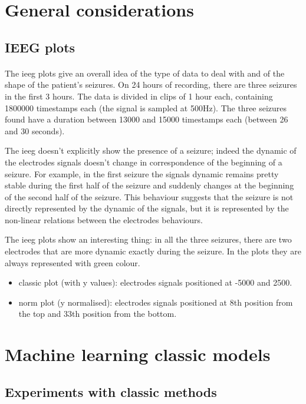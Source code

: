 \section{General considerations}

\subsection{IEEG plots}
\paragraph{} The ieeg plots give an overall idea of the type of data to deal with and of the shape of the patient's seizures. On 24 hours of recording, there are three seizures in the first 3 hours. The data is divided in clips of 1 hour each, containing 1800000 timestamps each (the signal is sampled at 500Hz). The three seizures found have a duration between 13000 and 15000 timestamps each (between 26 and 30 seconds).

The ieeg doesn't explicitly show the presence of a seizure; indeed the dynamic of the electrodes signals doesn't change in correspondence of the beginning of a seizure. For example, in the first seizure the signals dynamic remains pretty stable during the first half of the seizure and suddenly changes at the beginning of the second half of the seizure. This behaviour suggests that the seizure is not directly represented by the dynamic of the signals, but it is represented by the non-linear relations between the electrodes behaviours.

The ieeg plots show an interesting thing: in all the three seizures, there are two electrodes that are more dynamic exactly during the seizure. In the plots they are always represented with green colour.
\begin{itemize}
    \item classic plot (with y values): electrodes signals positioned at -5000 and 2500.
    \item norm plot (y normalised): electrodes signals positioned at 8th position from the top and 33th position from the bottom.
\end{itemize}


\section{Machine learning classic models}

\subsection{Experiments with classic methods}
